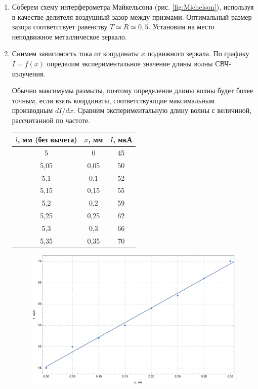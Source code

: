 \documentclass[a4paper, 12pt]{article}
\begin{document}
	\begin{enumerate}
		\item Соберем схему интерферометра Майкельсона (рис. \ref{fig:Michelson}), используя в качестве делителя воздушный зазор между призмами. Оптимальный размер зазора соответствует равенству $T\simeq R\simeq 0,5$. Установим на место неподвижное металлическое зеркало.
		\item Снимем зависимость тока от координаты $x$ подвижного зеркала. По графику $I=f\left(x\right)$ определим экспериментальное значение длины волны СВЧ-излучения.\par
			Обычно максимумы размыты, поэтому определение длины волны будет более точным, если взять координаты, соответствующие максимальным производным $dI/dx$. Сравним экспериментальную длину волны с величиной, рассчитанной по частоте.
			\begin{table}[h]
				\centering
				\begin{tabular}{|c|c|c|}
					\hline
					$l$, мм (без вычета)& $x$, мм & $I$, мкА\\
					\hline
					5 & 0 & 45\\
					5,05 &	0,05 & 50\\
					5,1 & 0,1 & 52\\
					5,15 & 0,15 & 55\\
					5,2 & 0,2 & 59\\
					5,25 & 0,25 & 62\\
					5,3 & 0,3 & 66\\
					5,35 & 0,35 & 70\\
					\hline
				\end{tabular}
			\end{table}
			\begin{figure}[h]
				\centering
				\includegraphics[scale=0.55]{Graphic3.pdf}

\end{figure}
\end{enumerate}
\end{document}
